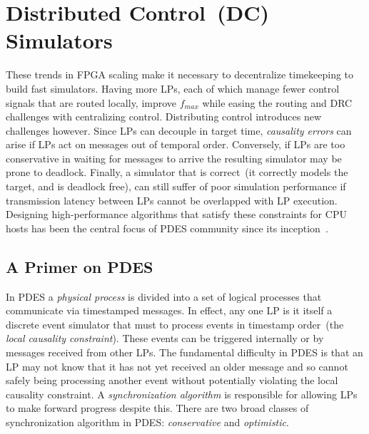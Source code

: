 \section{Distributed Control~(DC) Simulators}
These trends in FPGA scaling make it necessary to decentralize timekeeping to
build fast simulators.  Having more LPs, each of which manage fewer control
signals that are routed locally, improve ${f_{max}}$ while easing the routing and
DRC challenges with centralizing control. Distributing control introduces new
challenges however.  Since LPs can decouple in target time, \emph{causality errors} can
arise if LPs act on messages out of temporal order. Conversely, if LPs are too
conservative in waiting for messages to arrive the resulting simulator may be prone to deadlock.
Finally, a simulator that is correct~(it correctly models the target, and is
deadlock free), can still suffer of poor simulation performance if transmission
latency between LPs cannot be overlapped with LP execution. Designing
high-performance algorithms that satisfy these constraints for CPU hosts has been the central focus of PDES
community since its inception~\cite{PDESFujimotoPrimer}.

\subsection{A Primer on PDES}

In PDES a \emph{physical process} is divided into a set of logical processes
that communicate via timestamped messages. In effect, any one LP is it itself a discrete
event simulator that must to process events in timestamp order~(the
\emph{local causality constraint}). These events can be triggered internally or
by messages received from other LPs. The fundamental difficulty in PDES is that
an LP may not know that it has not yet received an older message and so cannot
safely being processing another event without potentially violating the local
causality constraint. A \emph{synchronization algorithm} is responsible for
allowing LPs to make forward progress despite this. There are two broad classes of synchronization algorithm in PDES:
\emph{conservative} and \emph{optimistic}.

